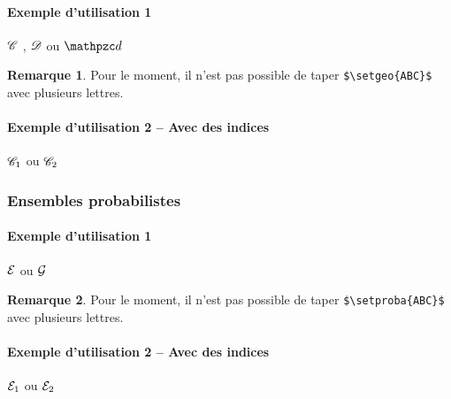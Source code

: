 \documentclass[12pt,a4paper]{article}
\theoremstyle{definition}
\newtheorem*{remark}{Remarque}
\begin{document}
\paragraph{Exemple d'utilisation 1}

\begin{latexex}
$\setgeo{C}$ ,
$\setgeo{D}$ ou
$\setgeo{d}$
\end{latexex}

\begin{remark}
	Pour le moment, il n'est pas possible de taper \verb+$\setgeo{ABC}$+ avec plusieurs lettres.
\end{remark}




\paragraph{Exemple d'utilisation 2 -- Avec des indices}

\begin{latexex}
$\setgeo*{C}{1}$ ou
$\setgeo*{C}{2}$
\end{latexex}




\subsubsection{Ensembles probabilistes}

\paragraph{Exemple d'utilisation 1}

\begin{latexex}
$\setproba{E}$ ou
$\setproba{G}$
\end{latexex}

\begin{remark}
	Pour le moment, il n'est pas possible de taper \verb+$\setproba{ABC}$+ avec plusieurs lettres.
\end{remark}




\paragraph{Exemple d'utilisation 2 -- Avec des indices}

\begin{latexex}
$\setproba*{E}{1}$ ou
$\setproba*{E}{2}$
\end{latexex}
\end{document}
